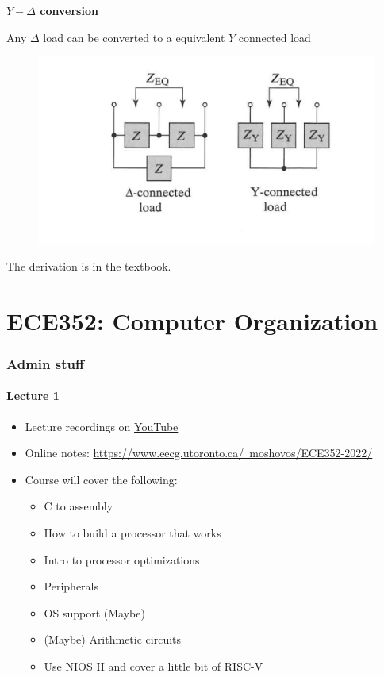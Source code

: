 \documentclass[10pt]{article}
\begin{document}
\begin{theorem}
	\textbf{$ Y-\Delta $ conversion}

	Any $ \Delta $ load can be converted to a equivalent $ Y $ connected load

	\begin{figure}[H]
		\centering
		\includegraphics[width=0.8\linewidth]{img/image_2022-09-19-11-28-05.png}
	\end{figure}

\end{theorem}

The derivation is in the textbook.








\part{ECE352: Computer Organization}

\section{Admin stuff}
\subsection{Lecture 1}



\begin{itemize}
	\item Lecture recordings on \href{https://tinyurl.com/2jthyk8k}{YouTube}
	\item Online notes: \href{https://www.eecg.utoronto.ca/~moshovos/ECE352-2022}{https://www.eecg.utoronto.ca/~moshovos/ECE352-2022/}
	\item Course will cover the following:
	 \begin{itemize}
	 	\item C to assembly
		\item How to build a processor that works
		\item Intro to processor optimizations
		\item Peripherals
		\item OS support (Maybe)
		\item (Maybe) Arithmetic circuits
		\item Use NIOS II and cover a little bit of RISC-V
	 \end{itemize}	
\end{itemize}
\end{document}
